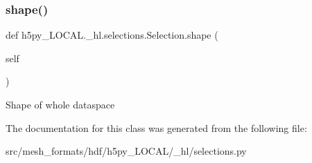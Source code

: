 \subsubsection{\texorpdfstring{shape()}{shape()}}
{\footnotesize\ttfamily def h5py\+\_\+\+L\+O\+C\+A\+L.\+\_\+hl.\+selections.\+Selection.\+shape (\begin{DoxyParamCaption}\item[{}]{self }\end{DoxyParamCaption})}

\begin{DoxyVerb}Shape of whole dataspace \end{DoxyVerb}
 

The documentation for this class was generated from the following file\+:\begin{DoxyCompactItemize}
\item 
src/mesh\+\_\+formats/hdf/h5py\+\_\+\+L\+O\+C\+A\+L/\+\_\+hl/selections.\+py\end{DoxyCompactItemize}
